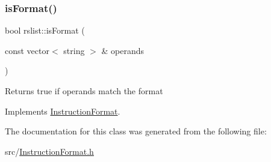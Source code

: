 \subsubsection{\texorpdfstring{is\+Format()}{isFormat()}}
{\footnotesize\ttfamily bool rslist\+::is\+Format (\begin{DoxyParamCaption}\item[{const vector$<$ string $>$ \&}]{operands }\end{DoxyParamCaption})\hspace{0.3cm}{\ttfamily [virtual]}}

Returns true if operands match the format 

Implements \hyperlink{classInstructionFormat_a9fdcf94dcd7d9a55ba86e7a63f04d1fe}{Instruction\+Format}.



The documentation for this class was generated from the following file\+:\begin{DoxyCompactItemize}
\item 
src/\hyperlink{InstructionFormat_8h}{Instruction\+Format.\+h}\end{DoxyCompactItemize}

